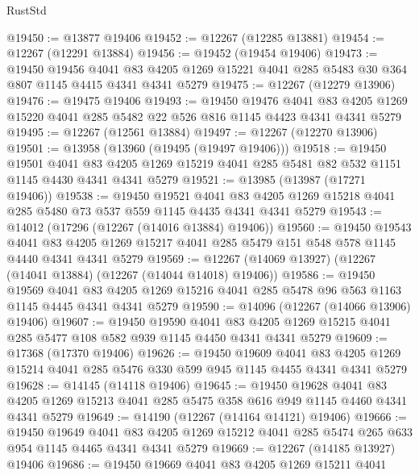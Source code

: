 \begin{lexlean}{RustStd}
\begin{coremodule}
@19450 := @13877 @19406
@19452 := @12267 (@12285 @13881)
@19454 := @12267 (@12291 @13884)
@19456 := @19452 (@19454 @19406)
@19473 := @19450
    @19456
    @4041
    @83
    @4205
    @1269
    @15221
    @4041
    @285
    @5483
    @30
    @364
    @807
    @1145
    @4415
    @4341
    @4341
    @5279
@19475 := @12267 (@12279 @13906)
@19476 := @19475 @19406
@19493 := @19450
    @19476
    @4041
    @83
    @4205
    @1269
    @15220
    @4041
    @285
    @5482
    @22
    @526
    @816
    @1145
    @4423
    @4341
    @4341
    @5279
@19495 := @12267 (@12561 @13884)
@19497 := @12267 (@12270 @13906)
@19501 := @13958 (@13960 (@19495 (@19497 @19406)))
@19518 := @19450
    @19501
    @4041
    @83
    @4205
    @1269
    @15219
    @4041
    @285
    @5481
    @82
    @532
    @1151
    @1145
    @4430
    @4341
    @4341
    @5279
@19521 := @13985 (@13987 (@17271 @19406))
@19538 := @19450
    @19521
    @4041
    @83
    @4205
    @1269
    @15218
    @4041
    @285
    @5480
    @73
    @537
    @559
    @1145
    @4435
    @4341
    @4341
    @5279
@19543 := @14012 (@17296 (@12267 (@14016 @13884) @19406))
@19560 := @19450
    @19543
    @4041
    @83
    @4205
    @1269
    @15217
    @4041
    @285
    @5479
    @151
    @548
    @578
    @1145
    @4440
    @4341
    @4341
    @5279
@19569 := @12267 (@14069 @13927) (@12267 (@14041 @13884) (@12267 (@14044 @14018) @19406))
@19586 := @19450
    @19569
    @4041
    @83
    @4205
    @1269
    @15216
    @4041
    @285
    @5478
    @96
    @563
    @1163
    @1145
    @4445
    @4341
    @4341
    @5279
@19590 := @14096 (@12267 (@14066 @13906) @19406)
@19607 := @19450
    @19590
    @4041
    @83
    @4205
    @1269
    @15215
    @4041
    @285
    @5477
    @108
    @582
    @939
    @1145
    @4450
    @4341
    @4341
    @5279
@19609 := @17368 (@17370 @19406)
@19626 := @19450
    @19609
    @4041
    @83
    @4205
    @1269
    @15214
    @4041
    @285
    @5476
    @330
    @599
    @945
    @1145
    @4455
    @4341
    @4341
    @5279
@19628 := @14145 (@14118 @19406)
@19645 := @19450
    @19628
    @4041
    @83
    @4205
    @1269
    @15213
    @4041
    @285
    @5475
    @358
    @616
    @949
    @1145
    @4460
    @4341
    @4341
    @5279
@19649 := @14190 (@12267 (@14164 @14121) @19406)
@19666 := @19450
    @19649
    @4041
    @83
    @4205
    @1269
    @15212
    @4041
    @285
    @5474
    @265
    @633
    @954
    @1145
    @4465
    @4341
    @4341
    @5279
@19669 := @12267 (@14185 @13927) @19406
@19686 := @19450
    @19669
    @4041
    @83
    @4205
    @1269
    @15211
    @4041

\end{coremodule}
\end{lexlean}

